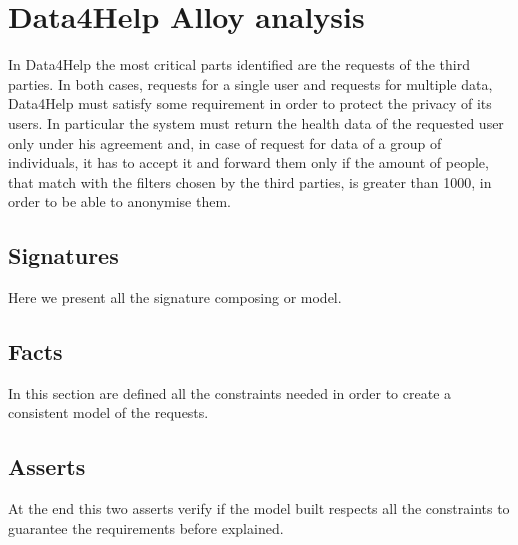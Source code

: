 \section{Data4Help Alloy analysis}

    In Data4Help the most critical parts identified are the requests of the third parties. In both cases, requests for a single user and requests for multiple data, Data4Help must satisfy some requirement in order to protect the privacy of its users.
    In particular the system must return the health data of the requested user only under his agreement and, in case of request for data of a group of individuals, it has to accept it and forward them only if the amount of people, that match with the filters chosen by the third parties, is greater than 1000, in order to be able to anonymise them.
    
    \subsection{Signatures}
    
    Here we present all the signature composing or model.
    
    

    \subsection{Facts}
 
        In this section are defined all the constraints needed in order to create a consistent model of the requests.
    
        

    \subsection{Asserts}
    
        At the end this two asserts verify if the model built respects all the constraints to guarantee the requirements before explained.
    
        






    
